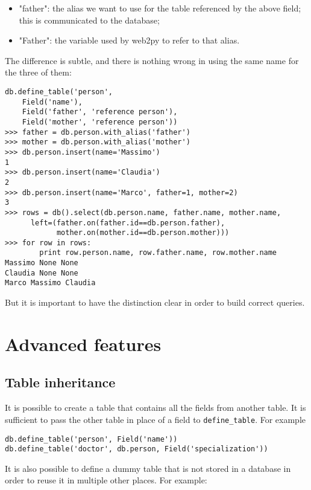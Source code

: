 \documentclass[justified,sixbynine,notoc]{tufte-book}
\def\ft{\small\tt}
\def\inxx#1{\index{#1}}
\begin{document}
\begin{fullwidth}
\begin{itemize}
\item "father": the alias we want to use for the table referenced by the above field; this is communicated to the database;

\item "Father": the variable used by web2py to refer to that alias.
\end{itemize}

The difference is subtle, and there is nothing wrong in using the same name for the three of them:
\begin{lstlisting}
db.define_table('person',
    Field('name'),
    Field('father', 'reference person'),
    Field('mother', 'reference person'))
>>> father = db.person.with_alias('father')
>>> mother = db.person.with_alias('mother')
>>> db.person.insert(name='Massimo')
1
>>> db.person.insert(name='Claudia')
2
>>> db.person.insert(name='Marco', father=1, mother=2)
3
>>> rows = db().select(db.person.name, father.name, mother.name,
      left=(father.on(father.id==db.person.father),
            mother.on(mother.id==db.person.mother)))
>>> for row in rows:
        print row.person.name, row.father.name, row.mother.name
Massimo None None
Claudia None None
Marco Massimo Claudia
\end{lstlisting}

But it is important to have the distinction clear in order to build correct queries.

\goodbreak\section{Advanced features}

\goodbreak\subsection{Table inheritance}

\inxx{inheritance}

It is possible to create a table that contains all the fields from another table. It is sufficient to pass the other table in place of a field to {\ft define\_table}. For example
\begin{lstlisting}
db.define_table('person', Field('name'))
db.define_table('doctor', db.person, Field('specialization'))
\end{lstlisting}

\inxx{dummy table}
It is also possible to define a dummy table that is not stored in a database in order to reuse it in multiple other places. For example:


\end{fullwidth}
\end{document}
